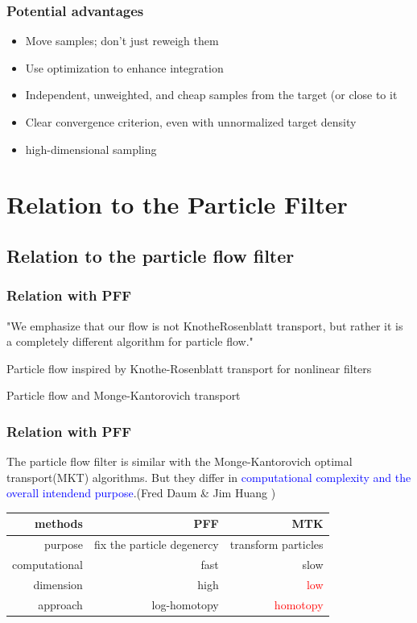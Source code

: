 \documentclass[table]{beamer}
\begin{document}
\begin{CJK}{UTF8}{gbsn}
\begin{frame}
\begin{figure}
\end{figure}
\end{frame}
\begin{frame}
\frametitle{Potential advantages}
\begin{itemize}
\item Move samples; don’t just reweigh them
\item Use optimization to enhance integration
\item Independent, unweighted, and cheap samples from the target (or
close to it
\item Clear convergence criterion, even with unnormalized target density
\item high-dimensional sampling
\end{itemize}

\end{frame}
\section{Relation to the Particle Filter}
\subsection{Relation to the particle flow filter}
\begin{frame}
\frametitle{Relation with PFF}
"We emphasize that our flow is not KnotheRosenblatt
transport, but rather it is a completely different
algorithm for particle flow."

\hfill

\begin{thebibliography}{1}
\beamertemplatearticlebibitems
{} Particle flow inspired by Knothe-Rosenblatt
transport for nonlinear filters

 Particle flow and Monge-Kantorovich transport
\end{thebibliography}

\end{frame}

\begin{frame}
\frametitle{Relation with PFF}
The particle flow filter is similar with the Monge-Kantorovich optimal transport(MKT) algorithms. But they differ in \textcolor{blue}{computational complexity and the overall intendend purpose}.(Fred Daum \& Jim Huang )


\begin{tabular}{|r|r|r|}
\hline
methods & PFF & MTK\\
\hline
purpose & fix the particle degenercy & transform   particles  \\
computational & fast & slow \\
dimension & high  & \textcolor{red}{low} \\
approach & log-homotopy & \textcolor{red}{homotopy} \\
\hline
\end{tabular}


\end{frame}
\end{CJK}
\end{document}
